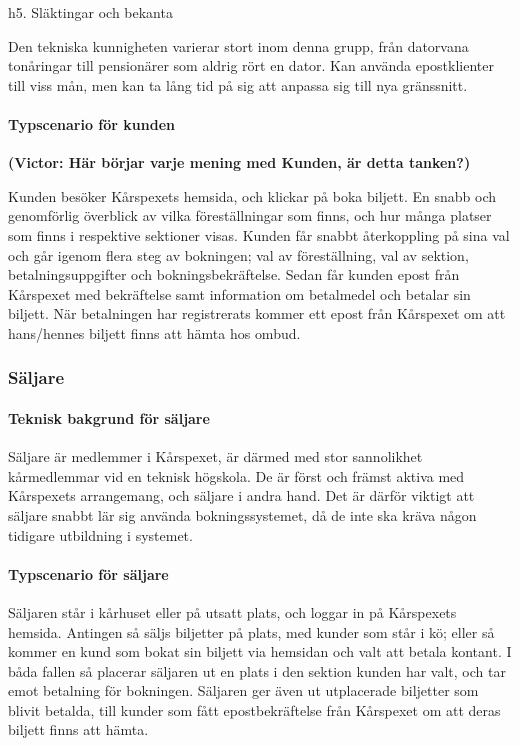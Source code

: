 \documentclass[a4paper, twoside, 11pt, titlepage]{article}
\begin{document}
			h5. Släktingar och bekanta

			Den tekniska kunnigheten varierar stort inom denna grupp, från datorvana tonåringar till pensionärer som aldrig rört en dator. Kan använda epostklienter till viss mån, men kan ta lång tid på sig att anpassa sig till nya gränssnitt.

			\paragraph{Typscenario för kunden}

			\textbf{(Victor: Här börjar varje mening med Kunden, är detta tanken?)}

			Kunden besöker Kårspexets hemsida, och klickar på boka biljett. En snabb och genomförlig överblick av vilka föreställningar som finns, och hur många platser som finns i respektive sektioner visas. Kunden får snabbt återkoppling på sina val och går igenom flera steg av bokningen; val av föreställning, val av sektion, betalningsuppgifter och bokningsbekräftelse. Sedan får kunden epost från Kårspexet med bekräftelse samt information om betalmedel och betalar sin biljett. När betalningen har registrerats kommer ett epost från Kårspexet om att hans/hennes biljett finns att hämta hos ombud.

		\subsubsection{Säljare}



			\paragraph{Teknisk bakgrund för säljare}

			Säljare är medlemmer i Kårspexet, är därmed med stor sannolikhet kårmedlemmar vid en teknisk högskola. De är först och främst aktiva med Kårspexets arrangemang, och säljare i andra hand. Det är därför viktigt att säljare snabbt lär sig använda bokningssystemet, då de inte ska kräva någon tidigare utbildning i systemet.

			\paragraph{Typscenario för säljare}

			Säljaren står i kårhuset eller på utsatt plats, och loggar in på Kårspexets hemsida. Antingen så säljs biljetter på plats, med kunder som står i kö; eller så kommer en kund som bokat sin biljett via hemsidan och valt att betala kontant. I båda fallen så placerar säljaren ut en plats i den sektion kunden har valt, och tar emot betalning för bokningen. Säljaren ger även ut utplacerade biljetter som blivit betalda, till kunder som fått epostbekräftelse från Kårspexet om att deras biljett finns att hämta.
\end{document}
